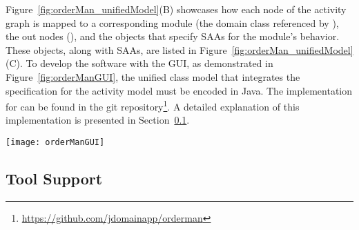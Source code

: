 Figure~\ref{fig:orderMan_unifiedModel}(B) showcases how each node of the activity graph is mapped to a corresponding module (\wrt the domain class referenced by ), the out nodes (\wrt {}), and the  objects that specify SAAs for the module's behavior. These  objects, along with SAAs, are listed in Figure~\ref{fig:orderMan_unifiedModel}(C). To develop the \orderman software with the GUI, as demonstrated in Figure~\ref{fig:orderManGUI}, the unified class model that integrates the \agl specification for the activity model must be encoded in Java. The implementation for \orderman can be found in the git repository\footnote{\url{https://github.com/jdomainapp/orderman}}. A detailed explanation of this implementation is presented in Section~\ref{subsect:toolSupport}.

\begin{figure*}[ht]
	\centering
	\texttt{[image: orderManGUI]}
	\caption{The GUI of the \orderman~software generated by the tool.} %
	\vspace{-0.3cm}
	\label{fig:orderManGUI}
\end{figure*}

\subsection{Tool Support}
\label{subsect:toolSupport} %


